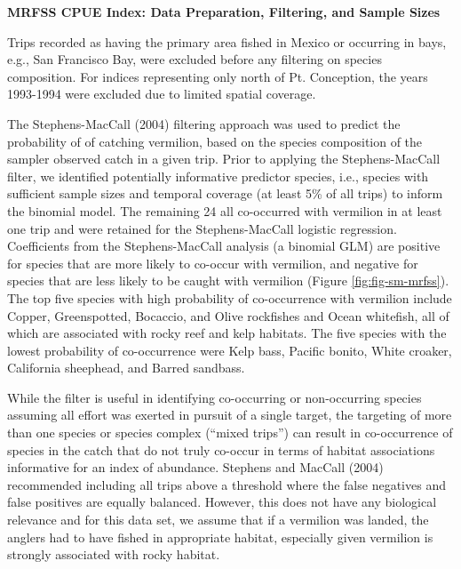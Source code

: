 \documentclass[11pt,
  english,
  a4paper,
]{article}
\begin{document}
\textbf{MRFSS CPUE Index: Data Preparation, Filtering, and Sample Sizes}

Trips recorded as having the primary area fished in Mexico or occurring in bays, e.g., San Francisco Bay, were excluded before any filtering on species composition. For indices representing only north of Pt. Conception, the years 1993-1994 were excluded due to limited spatial coverage.

The Stephens-MacCall {(2004)\leavevmode\tagmcend\tagstructend} filtering approach was used to predict the probability of of catching vermilion, based on the species composition of the sampler observed catch in a given trip. Prior to applying the Stephens-MacCall filter, we identified potentially informative predictor species, i.e., species with sufficient sample sizes and temporal coverage (at least 5\% of all trips) to inform the binomial model. The remaining 24 all co-occurred with vermilion in at least one trip and were retained for the Stephens-MacCall logistic regression. Coefficients from the Stephens-MacCall analysis (a binomial GLM) are positive for species that are more likely to co-occur with vermilion, and negative for species that are less likely to be caught with vermilion (Figure \ref{fig:fig-sm-mrfss}). The top five species with high probability of co-occurrence with vermilion include Copper, Greenspotted, Bocaccio, and Olive rockfishes and Ocean whitefish, all of which are associated with rocky reef and kelp habitats. The five species with the lowest probability of co-occurrence were Kelp bass, Pacific bonito, White croaker, California sheephead, and Barred sandbass.

While the filter is useful in identifying co-occurring or non-occurring species assuming all effort was exerted in pursuit of a single target, the targeting of more than one species or species complex (``mixed trips'') can result in co-occurrence of species in the catch that do not truly co-occur in terms of habitat associations informative for an index of abundance. Stephens and MacCall {(2004)\leavevmode\tagmcend\tagstructend} recommended including all trips above a threshold where the false negatives and false positives are equally balanced. However, this does not have any biological relevance and for this data set, we assume that if a vermilion was landed, the anglers had to have fished in appropriate habitat, especially given vermilion is strongly associated with rocky habitat.
\end{document}

